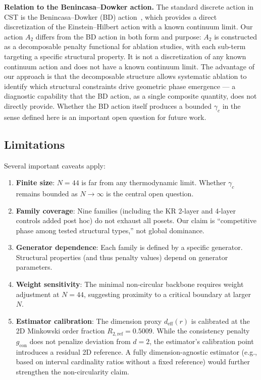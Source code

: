 \documentclass[11pt,a4paper]{article}
\begin{document}
\textbf{Relation to the Benincasa--Dowker action.} The standard discrete action in CST is the Benincasa--Dowker (BD) action~\cite{benincasa2010,benincasa2011}, which provides a direct discretization of the Einstein--Hilbert action with a known continuum limit. Our action $A_2$ differs from the BD action in both form and purpose: $A_2$ is constructed as a decomposable penalty functional for ablation studies, with each sub-term targeting a specific structural property. It is not a discretization of any known continuum action and does not have a known continuum limit. The advantage of our approach is that the decomposable structure allows systematic ablation to identify which structural constraints drive geometric phase emergence --- a diagnostic capability that the BD action, as a single composite quantity, does not directly provide. Whether the BD action itself produces a bounded $\gamma_c$ in the sense defined here is an important open question for future work.

\subsection{Limitations}

Several important caveats apply:

\begin{enumerate}[nosep]
    \item \textbf{Finite size}: $N = 44$ is far from any thermodynamic limit. Whether $\gamma_c$ remains bounded as $N \to \infty$ is the central open question.
    \item \textbf{Family coverage}: Nine families (including the KR 2-layer and 4-layer controls added post hoc) do not exhaust all posets. Our claim is ``competitive phase among tested structural types,'' not global dominance.
    \item \textbf{Generator dependence}: Each family is defined by a specific generator. Structural properties (and thus penalty values) depend on generator parameters.
    \item \textbf{Weight sensitivity}: The minimal non-circular backbone requires weight adjustment at $N = 44$, suggesting proximity to a critical boundary at larger~$N$.
    \item \textbf{Estimator calibration}: The dimension proxy $d_{\text{eff}}(r)$ is calibrated at the 2D Minkowski order fraction $R_{2,\text{ref}} = 0.5009$. While the consistency penalty $g_{\text{con}}$ does not penalize deviation from $d = 2$, the estimator's calibration point introduces a residual 2D reference. A fully dimension-agnostic estimator (e.g., based on interval cardinality ratios without a fixed reference) would further strengthen the non-circularity claim.
\end{enumerate}
\end{document}

